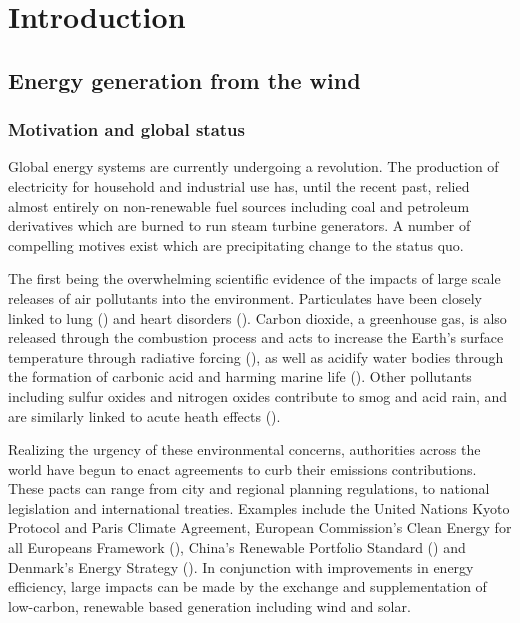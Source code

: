 \chapter{Introduction}
\label{sec:intro}

\clearpage
\section{Energy generation from the wind}
\label{sec:intro_engen}


\subsection{Motivation and global status}
\label{sec:intro_history}

Global energy systems are currently undergoing a revolution. The production of electricity for household and industrial use has, until the recent past, relied almost entirely on non-renewable fuel sources including coal and petroleum derivatives which are burned to run steam turbine generators. A number of compelling motives exist which are precipitating change to the status quo.

The first being the overwhelming scientific evidence of the impacts of large scale releases of air pollutants into the environment. Particulates have been closely linked to lung (\cite{hamra_outdoor_2014}) and heart disorders (\cite{du_air_2016}). Carbon dioxide, a greenhouse gas, is also released through the combustion process and acts to increase the Earth's surface temperature through radiative forcing (\cite{charlson_climate_1992}), as well as acidify water bodies through the formation of carbonic acid and harming marine life (\cite{doney_ocean_2009}). Other pollutants including sulfur oxides and nitrogen oxides contribute to smog and acid rain, and are similarly linked to acute heath effects (\cite{brunekreef_air_2002}).

Realizing the urgency of these environmental concerns, authorities across the world have begun to enact agreements to curb their emissions contributions. These pacts can range from city and regional planning regulations, to national legislation and international treaties. Examples include the United Nations Kyoto Protocol and Paris Climate Agreement, European Commission's Clean Energy for all Europeans Framework (\cite{ec_clean_energy}), China's Renewable Portfolio Standard (\cite{china_rps}) and Denmark's Energy Strategy (\cite{danmark_energi}). In conjunction with improvements in energy efficiency, large impacts can be made by the exchange and supplementation of low-carbon, renewable based generation including wind and solar.

